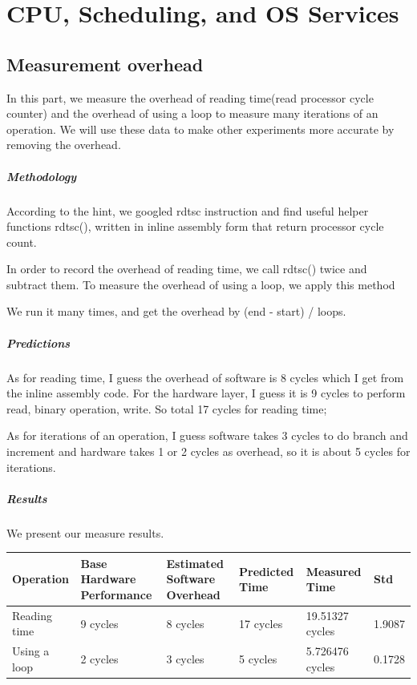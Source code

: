 \chapter{CPU, Scheduling, and OS Services}

\section{Measurement overhead}
In this part, we measure the overhead of reading time(read processor cycle counter) and the overhead of using a loop to measure many iterations of an operation. We will use these data to make other experiments more accurate by removing the overhead.

\paragraph{Methodology}
According to the hint, we googled rdtsc instruction and find useful helper functions rdtsc()\cite{rdtsc}, written in inline assembly form that return processor cycle count. 

In order to record the overhead of reading time, we call rdtsc() twice and subtract them. To measure the overhead of using a loop, we apply this method

We run it many times, and get the overhead by (end - start) / loops.

\paragraph{Predictions}
As for reading time, I guess the overhead of software is 8 cycles which I get from the inline assembly code. For the hardware layer, I guess it is 9 cycles to perform read, binary operation, write. So total 17 cycles for reading time; 

As for iterations of an operation, I guess software takes 3 cycles to do branch and increment and hardware takes 1 or 2 cycles as overhead, so it is about 5 cycles for iterations.

\paragraph{Results}
We present our measure results.

\begin{center}
\begin{tabular}{| p{2cm} | p{3cm} | p{3cm} | p{2cm} | p{3cm} | p{1cm} }
Operation  & Base Hardware Performance  & Estimated Software Overhead  & Predicted Time  & Measured Time  & Std  \\
\hline
Reading time & 9 cycles& 8 cycles& 17 cycles& 19.51327 cycles  & 1.9087  \\
Using a loop  & 2 cycles& 3 cycles& 5 cycles& 5.726476 cycles & 0.1728 \\
\end{tabular}
\end{center}

